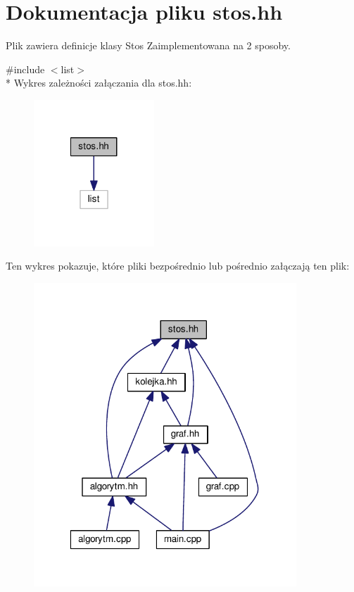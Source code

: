 \hypertarget{stos_8hh}{\section{Dokumentacja pliku stos.\-hh}
\label{stos_8hh}
}


Plik zawiera definicje klasy {\ttfamily Stos} Zaimplementowana na 2 sposoby.  


{\ttfamily \#include $<$list$>$}\\*
Wykres zależności załączania dla stos.\-hh\-:\nopagebreak
\begin{figure}[H]
\begin{center}
\leavevmode
\includegraphics[width=128pt]{stos_8hh__incl}
\end{center}
\end{figure}
Ten wykres pokazuje, które pliki bezpośrednio lub pośrednio załączają ten plik\-:\nopagebreak
\begin{figure}[H]
\begin{center}
\leavevmode
\includegraphics[width=280pt]{stos_8hh__dep__incl}
\end{center}
\end{figure}
